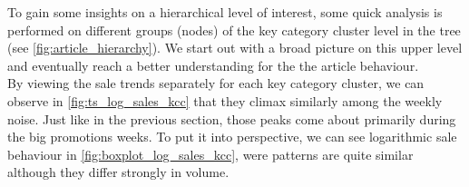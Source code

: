 

To gain some insights on a hierarchical level of interest, some quick analysis is performed on different groups (nodes) of the key category cluster level in the tree (see \autoref{fig:article_hierarchy}). We start out with a broad picture on this upper level 
and eventually reach a better understanding for the the article behaviour.
\\



By viewing the sale trends separately for each key category cluster, we can observe in \autoref{fig:ts_log_sales_kcc} that they climax similarly among the weekly noise. Just like in the previous section, those peaks come about primarily during the big promotions weeks. To put it into perspective, we can see logarithmic sale behaviour in \autoref{fig:boxplot_log_sales_kcc}, were patterns are quite similar although they differ strongly in volume. 
\\


